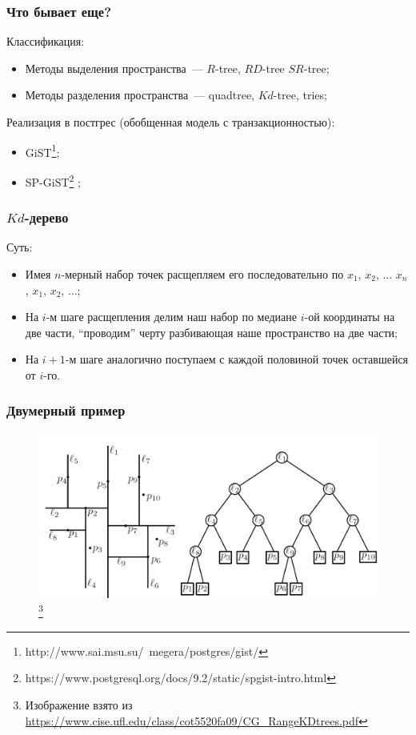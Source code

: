 \documentclass{beamer}
\begin{document}
\begin{frame}
\frametitle{Что бывает еще?}

Классификация:

\begin{itemize}
  \setlength\itemsep{1em}
  \item Методы выделения пространства~--- $R$-tree, $RD$-tree $SR$-tree;
  \item Методы разделения пространства~--- quadtree, $Kd$-tree, tries;
\end{itemize}

Реализация в постгрес (обобщенная модель с транзакционностью):
\begin{itemize}
  \setlength\itemsep{1em}
  \item GiST\footnote{http://www.sai.msu.su/~megera/postgres/gist/};
  \item SP-GiST\footnote{https://www.postgresql.org/docs/9.2/static/spgist-intro.html} \cite{Eltabakh2006};
\end{itemize}


\end{frame}

\begin{frame}
\frametitle{$Kd$-дерево}
Суть:
\begin{itemize}
  \setlength\itemsep{1em}
  \item Имея $n$-мерный набор точек расщепляем его последовательно по $x_1$, $x_2$, $\ldots$ $x_n$, $x_1$, $x_2$, $\ldots$;
  \item На $i$-м шаге расщепления делим наш набор по медиане $i$-ой координаты на две части, ``проводим'' черту разбивающая наше пространство на две части;
  \item На $i+1$-м шаге аналогично поступаем с каждой половиной точек оставшейся от $i$-го.
  
\end{itemize}

\end{frame}

\begin{frame}
\frametitle{Двумерный пример}

\begin{figure}[htb]
\includegraphics[width=\textwidth,height=0.8\textheight,keepaspectratio]{ex1.png} 
\footnote{\tiny{Изображение взято из \url{https://www.cise.ufl.edu/class/cot5520fa09/CG_RangeKDtrees.pdf}}}
\end{figure}   

\end{frame}
\end{document}
